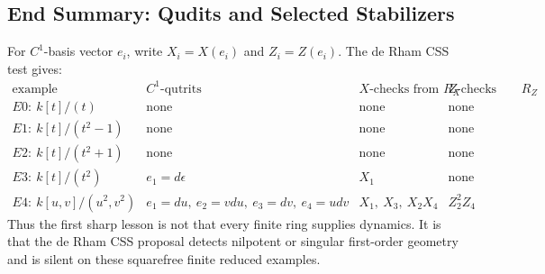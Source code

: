 \subsection{End Summary: Qudits and Selected Stabilizers}
For \(C^1\)-basis vector \(e_i\), write \(X_i=X(e_i)\) and
\(Z_i=Z(e_i)\).  The de Rham CSS test gives:
{\scriptsize
\[
\begin{array}{c|c|c|c}
\text{example} & C^1\text{-qutrits} & X\text{-checks from }R_X
  & Z\text{-checks from }R_Z\\ \hline
E0:\ k[t]/(t) & \text{none} & \text{none} & \text{none}\\
E1:\ k[t]/(t^2-1) & \text{none} & \text{none} & \text{none}\\
E2:\ k[t]/(t^2+1) & \text{none} & \text{none} & \text{none}\\
E3:\ k[t]/(t^2) & e_1=d\epsilon & X_1 & \text{none}\\
E4:\ k[u,v]/(u^2,v^2) &
  e_1=du,\ e_2=vdu,\ e_3=dv,\ e_4=udv &
  X_1,\ X_3,\ X_2X_4 &
  Z_2^2Z_4
\end{array}
\]
}
Thus the first sharp lesson is not that every finite ring supplies dynamics.
It is that the de Rham CSS proposal detects nilpotent or singular first-order
geometry and is silent on these squarefree finite reduced examples.
